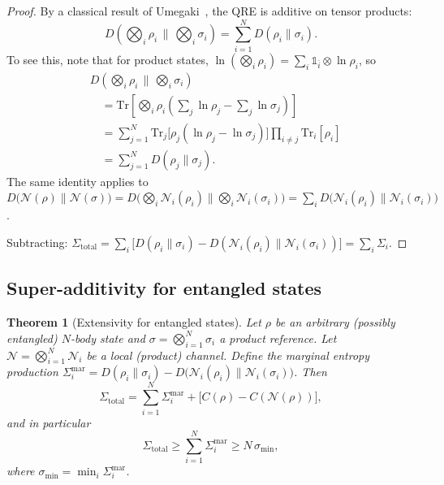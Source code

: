 \documentclass[letterpaper,twocolumn,superscriptaddress,longbibliography]{revtex4-2}
\newtheorem{theorem}{Theorem}[section]
\newcommand{\Tr}{\mathrm{Tr}}
\newcommand{\chan}{\mathcal{N}}
\begin{document}
\begin{proof}
By a classical result of Umegaki~\cite{Umegaki1962}, the QRE is
additive on tensor products:
\begin{equation}
  D\!\left(\bigotimes_i \rho_i \,\bigg\|\, \bigotimes_i \sigma_i\right)
  = \sum_{i=1}^{N} D(\rho_i \| \sigma_i).
  \label{eq:QRE_additive}
\end{equation}
To see this, note that for product states,
$\ln(\bigotimes_i \rho_i) = \sum_i \mathbb{1}_{\bar{i}} \otimes
\ln \rho_i$, so
\begin{align}
  &D\!\left(\bigotimes_i \rho_i \,\bigg\|\, \bigotimes_i \sigma_i\right)
  \nonumber \\
  &\quad= \Tr\!\left[\bigotimes_i \rho_i
    \left(\sum_j \ln\rho_j - \sum_j \ln\sigma_j\right)\right]
  \nonumber \\
  &\quad= \sum_{j=1}^{N}
    \Tr_j\!\big[\rho_j (\ln\rho_j - \ln\sigma_j)\big]
    \prod_{i \neq j} \Tr_i[\rho_i]
  \nonumber \\
  &\quad= \sum_{j=1}^{N} D(\rho_j \| \sigma_j).
  \label{eq:QRE_additive_proof}
\end{align}
The same identity applies to
$D\bigl(\chan(\rho)\|\chan(\sigma)\bigr) =
D\bigl(\bigotimes_i \chan_i(\rho_i) \| \bigotimes_i
\chan_i(\sigma_i)\bigr) = \sum_i
D\bigl(\chan_i(\rho_i)\|\chan_i(\sigma_i)\bigr)$.

Subtracting:
$\Sigma_{\mathrm{total}} =
\sum_i \bigl[D(\rho_i\|\sigma_i) -
D(\chan_i(\rho_i)\|\chan_i(\sigma_i))\bigr] =
\sum_i \Sigma_i$.
\end{proof}

\subsection{Super-additivity for entangled states}

\begin{theorem}[Extensivity for entangled states]
\label{thm:extensivity}
Let $\rho$ be an arbitrary (possibly entangled) $N$-body state and
$\sigma = \bigotimes_{i=1}^{N} \sigma_i$ a product reference.
Let $\chan = \bigotimes_{i=1}^{N} \chan_i$ be a local (product)
channel.
Define the marginal entropy production
$\Sigma_i^{\mathrm{mar}} = D(\rho_i \| \sigma_i) -
D\bigl(\chan_i(\rho_i)\|\chan_i(\sigma_i)\bigr)$.
Then
\begin{equation}
  \Sigma_{\mathrm{total}}
  = \sum_{i=1}^{N} \Sigma_i^{\mathrm{mar}}
    + \bigl[C(\rho) - C(\chan(\rho))\bigr],
  \label{eq:Sigma_decomp}
\end{equation}
and in particular
\begin{equation}
  \Sigma_{\mathrm{total}}
  \geq \sum_{i=1}^{N} \Sigma_i^{\mathrm{mar}}
  \geq N \, \sigma_{\min},
  \label{eq:Sigma_bound}
\end{equation}
where $\sigma_{\min} = \min_i \Sigma_i^{\mathrm{mar}}$.
\end{theorem}
\end{document}
